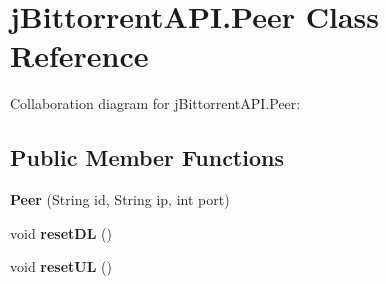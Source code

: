 \hypertarget{classj_bittorrent_a_p_i_1_1_peer}{
\section{jBittorrentAPI.Peer Class Reference}
\label{classj_bittorrent_a_p_i_1_1_peer}
}
Collaboration diagram for jBittorrentAPI.Peer:\subsection*{Public Member Functions}
\begin{DoxyCompactItemize}
\item 
\hypertarget{classj_bittorrent_a_p_i_1_1_peer_ae977124ca29476d3c58e99c62bb9759e}{
{\bfseries Peer} (String id, String ip, int port)}
\label{classj_bittorrent_a_p_i_1_1_peer_ae977124ca29476d3c58e99c62bb9759e}

\item 
\hypertarget{classj_bittorrent_a_p_i_1_1_peer_ac753065b7a9cecc5ca4332819b6b88f5}{
void {\bfseries resetDL} ()}
\label{classj_bittorrent_a_p_i_1_1_peer_ac753065b7a9cecc5ca4332819b6b88f5}

\item 
\hypertarget{classj_bittorrent_a_p_i_1_1_peer_aa56dc3f3b5681c045c4c8473687177e0}{
void {\bfseries resetUL} ()}
\label{classj_bittorrent_a_p_i_1_1_peer_aa56dc3f3b5681c045c4c8473687177e0}


\end{DoxyCompactItemize}
